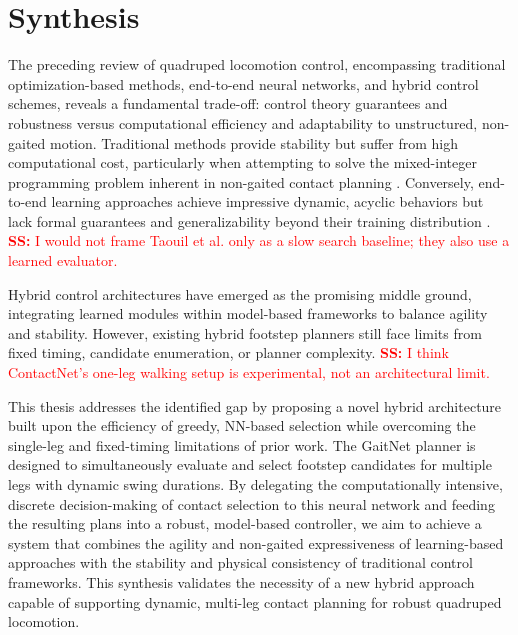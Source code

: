 \section{Synthesis}
\label{sec:background-synthesis}

The preceding review of quadruped locomotion control, encompassing
traditional optimization-based methods, end-to-end neural networks,
and hybrid control schemes, reveals a fundamental trade-off: control
theory guarantees and robustness versus computational efficiency and
adaptability to unstructured, non-gaited motion. Traditional methods
provide stability but suffer from high computational cost,
particularly when attempting to solve the mixed-integer programming
problem inherent in non-gaited contact planning
\cite{winkler_gait_2018, taouil_non-gaited_2024}. Conversely,
end-to-end learning approaches achieve impressive dynamic, acyclic
behaviors but lack formal guarantees and generalizability beyond
their training distribution \cite{zhang_learning_2023}.
\textcolor{red}{\textbf{SS:} I would not frame Taouil et al. only as
a slow search baseline; they also use a learned evaluator.}

Hybrid control architectures have emerged as the promising middle
ground, integrating learned modules within model-based frameworks to
balance agility and stability. However, existing hybrid footstep
planners still face limits from fixed timing, candidate
enumeration, or planner complexity.
\textcolor{red}{\textbf{SS:} I think ContactNet's one-leg walking
setup is experimental, not an architectural limit.}

This thesis addresses the identified gap by proposing a novel hybrid
architecture built upon the efficiency of greedy, NN-based selection
while overcoming the single-leg and fixed-timing limitations of prior
work. The GaitNet planner is designed to simultaneously
evaluate and select footstep candidates for multiple legs with
dynamic swing durations. By delegating the computationally intensive,
discrete decision-making of contact selection to this neural network
and feeding the resulting plans into a robust, model-based
controller, we aim to achieve a system that combines the agility and
non-gaited expressiveness of learning-based approaches with the
stability and physical consistency of traditional control frameworks.
This synthesis validates the necessity of a new hybrid approach
capable of supporting dynamic, multi-leg contact planning for robust
quadruped locomotion.
